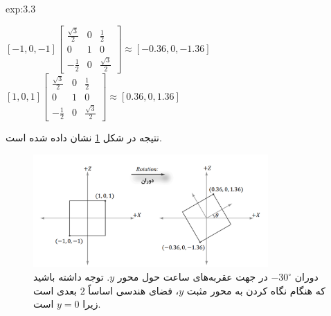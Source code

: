{\begin{spacing}{1.5}
\begin{example}{exp:3.3}
            \begin{center}
                $[-1,0,-1]\begin{bmatrix}
                              \frac{\displaystyle \sqrt{\displaystyle 3}}{\displaystyle 2} & 0 & \frac{\displaystyle 1}{\displaystyle 2}                      \\
                              0                                                            & 1 & 0                                                            \\
                              -\frac{\displaystyle 1}{\displaystyle 2}                     & 0 & \frac{\displaystyle \sqrt{\displaystyle 3}}{\displaystyle 2}
                \end{bmatrix}\approx[-0.36,0,-1.36]$\\
                $[1,0,1]\begin{bmatrix}
                            \frac{\displaystyle \sqrt{\displaystyle 3}}{\displaystyle 2} & 0 & \frac{\displaystyle 1}{\displaystyle 2}                      \\
                            0                                                            & 1 & 0                                                            \\
                            -\frac{\displaystyle 1}{\displaystyle 2}                     & 0 & \frac{\displaystyle \sqrt{\displaystyle 3}}{\displaystyle 2}
                \end{bmatrix}\approx[0.36,0,1.36]$
            \end{center}

            نتیجه در شکل \ref{fig:4.Session.1.3.4} نشان داده شده است.

            \begin{figure}[H]
                \centering
                \setlength{\belowcaptionskip}{-10pt}
                \includegraphics[width=0.8\textwidth]{Images/4/3/4.Session.1.3.4}
                \caption {دوران $-30^\circ$ در جهت عقربه‌های ساعت حول محور $y$.
                توجه داشته باشید که هنگام نگاه کردن به محور مثبت $y$، فضای هندسی اساساً $2$ بعدی است زیرا $y=0$ است. \textbf{\vspace{20pt}}}
                \label{fig:4.Session.1.3.4}
            \end{figure}
        \end{example}
    \end{spacing}
}


